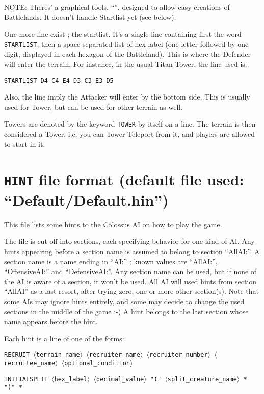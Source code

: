 \documentclass{article}
\begin{document}
NOTE: Theres' a graphical tools,
``'',
designed to allow easy creations of Battlelands. It doesn't handle Startlist yet (see below).

One more line exist ; the startlist. It's a single line containing first the word \texttt{STARTLIST}, then a space-separated list of hex label (one letter followed by one digit, displayed in each hexagon of the Battleland). This is where the Defender will enter the terrain. For instance, in the usual Titan Tower, the line used is:

\texttt{STARTLIST D4 C4 E4 D3 C3 E3 D5}

Also, the line imply the Attacker will enter by the bottom side. This is usually used for Tower, but can be used for other terrain as well.

Towers are denoted by the keyword \texttt{TOWER} by itself on a line. The terrain is then considered a Tower, i.e. you can Tower Teleport from it, and players are allowed to start in it.

\section{\texttt{HINT} file format (default file used: ``Default/Default.hin'')}

This file lists some hints to the Colossus AI on how to play the game.

The file is cut off into sections, each specifying behavior for one kind of AI. Any hints appearing before a section name is assumed to belong to section ``AllAI:''. A section name is a name ending in ``AI:'' ; known values are ``AllAI:'', ``OffensiveAI:'' and ``DefensiveAI:''. Any section name can be used, but if none of the AI is aware of a section, it won't be used. All AI will used hints from section ``AllAI'' as a last resort, after trying zero, one or more other section(s). Note that some AIs may ignore hints entirely, and some may decide to change the used sections in the middle of the game :-) A hint belongs to the last section whose name appears before the hint.

Each hint is a line of one of the forms:

\texttt{RECRUIT $\langle$terrain\_name$\rangle$ $\langle$recruiter\_name$\rangle$ $\langle$recruiter\_number$\rangle$  $\langle$recruitee\_name$\rangle$ $\langle$optional\_condition$\rangle$}

\texttt{INITIALSPLIT $\langle$hex\_label$\rangle$ $\langle$decimal\_value$\rangle$ "(" $\langle$split\_creature\_name$\rangle$ * ")" *}
\end{document}
